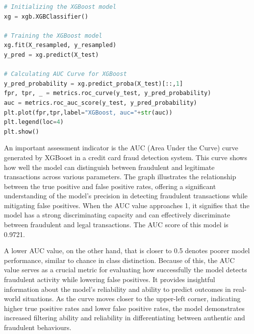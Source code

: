  \begin{lstlisting}[language=Python, caption={Code snippet in \LaTeX ~and  this is a Python code example}, label=list:python_code_ex]
# Initializing the XGBoost model
xg = xgb.XGBClassifier()

# Training the XGBoost model
xg.fit(X_resampled, y_resampled)
y_pred = xg.predict(X_test)

# Calculating AUC Curve for XGBoost
y_pred_probability = xg.predict_proba(X_test)[::,1]
fpr, tpr, _ = metrics.roc_curve(y_test, y_pred_probability)
auc = metrics.roc_auc_score(y_test, y_pred_probability)
plt.plot(fpr,tpr,label="XGBoost, auc="+str(auc))
plt.legend(loc=4)
plt.show()
\end{lstlisting}


 An important assessment indicator is the AUC (Area Under the Curve) curve generated by XGBoost in a credit card fraud detection system. This curve shows how well the model can distinguish between fraudulent and legitimate transactions across various parameters. The graph illustrates the relationship between the true positive and false positive rates, offering a significant understanding of the model's precision in detecting fraudulent transactions while mitigating false positives. When the AUC value approaches 1, it signifies that the model has a strong discriminating capacity and can effectively discriminate between fraudulent and legal transactions. The AUC score of this model is 0.9721. 

 

 A lower AUC value, on the other hand, that is closer to 0.5 denotes poorer model performance, similar to chance in class distinction. Because of this, the AUC value serves as a crucial metric for evaluating how successfully the model detects fraudulent activity while lowering false positives. It provides insightful information about the model's reliability and ability to predict outcomes in real-world situations. As the curve moves closer to the upper-left corner, indicating higher true positive rates and lower false positive rates, the model demonstrates increased filtering ability and reliability in differentiating between authentic and fraudulent behaviours. 


